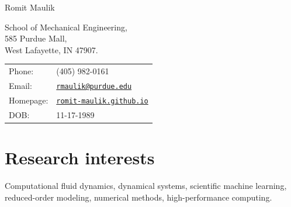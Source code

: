 \documentclass[letterpaper]{article}
\def\name{Romit Maulik}
\begin{document}
{\huge \name}


\vspace{0.25in}

\begin{minipage}{0.45\linewidth}
  School of Mechanical Engineering, \\
  585 Purdue Mall, \\
  West Lafayette, IN 47907.
\end{minipage}
\begin{minipage}{0.45\linewidth}
  \begin{tabular}{ll}
    Phone: & (405) 982-0161 \\
    Email: & \href{mailto:rmaulik@purdue.edu}{\tt rmaulik@purdue.edu} \\
    Homepage: & \href{https://romit-maulik.github.io/}{\tt romit-maulik.github.io} \\
    DOB: & 11-17-1989
  \end{tabular}
\end{minipage}

\section*{Research interests}

Computational fluid dynamics, dynamical systems, scientific machine learning, reduced-order modeling, numerical methods, high-performance computing.
\end{document}
